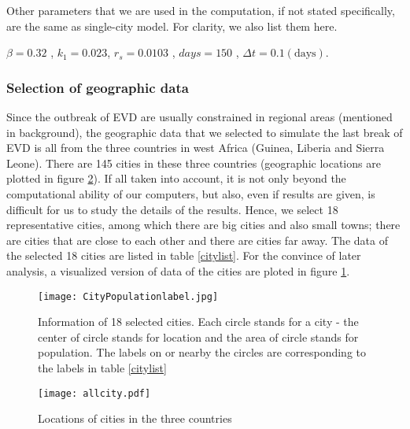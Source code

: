 Other parameters that we are used in the computation, if not stated specifically, are the same as single-city model. For clarity, we also list them here.

$\beta = 0.32$ , $k_1 = 0.023$, $r_s = 0.0103$ , $days = 150$ ,  $\Delta t = 0.1 (\text{days})$.

\subsubsection{Selection of geographic data}
Since the outbreak of EVD are usually constrained in regional areas (mentioned in background), the geographic data that we selected to simulate the last break of EVD is all from the three countries in west Africa (Guinea, Liberia and Sierra Leone). There are 145 cities in these three countries (geographic locations are plotted in figure \ref{allcity}). If all taken into account, it is not only beyond the computational ability of our computers, but also, even if results are given, is difficult for us to study the details of the results. Hence, we select 18 representative cities, among which there are big cities and also small towns; there are cities that are close to each other and there are cities far away. The data of the selected 18 cities are listed in table \ref{citylist}. For the convince of later analysis, a visualized version of data of the cities are ploted in figure \ref{cityplot}. 

\begin{figure}
\centering
\texttt{[image: CityPopulationlabel.jpg]}
\caption{Information of 18 selected cities. Each circle stands for a city - the center of circle stands for location and the area of circle stands for population. The labels on or nearby the circles are corresponding to the labels in table \ref{citylist}}
\label{cityplot}
\end{figure}

\begin{figure}
\centering
\texttt{[image: allcity.pdf]}
\caption{Locations of cities in the three countries}
\label{allcity}
\end{figure}

